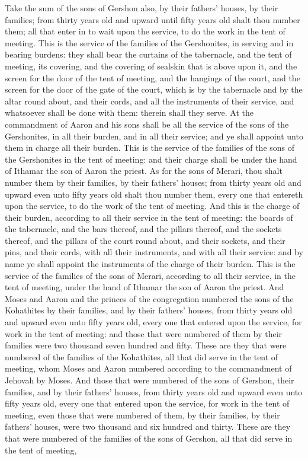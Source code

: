 Take the sum of the sons of Gershon also, by their fathers’ houses, by their families; from thirty years old and upward until fifty years old shalt thou number them; all that enter in to wait upon the service, to do the work in the tent of meeting. This is the service of the families of the Gershonites, in serving and in bearing burdens: they shall bear the curtains of the tabernacle, and the tent of meeting, its covering, and the covering of sealskin that is above upon it, and the screen for the door of the tent of meeting, and the hangings of the court, and the screen for the door of the gate of the court, which is by the tabernacle and by the altar round about, and their cords, and all the instruments of their service, and whatsoever shall be done with them: therein shall they serve. At the commandment of Aaron and his sons shall be all the service of the sons of the Gershonites, in all their burden, and in all their service; and ye shall appoint unto them in charge all their burden. This is the service of the families of the sons of the Gershonites in the tent of meeting: and their charge shall be under the hand of Ithamar the son of Aaron the priest.  As for the sons of Merari, thou shalt number them by their families, by their fathers’ houses; from thirty years old and upward even unto fifty years old shalt thou number them, every one that entereth upon the service, to do the work of the tent of meeting. And this is the charge of their burden, according to all their service in the tent of meeting: the boards of the tabernacle, and the bars thereof, and the pillars thereof, and the sockets thereof, and the pillars of the court round about, and their sockets, and their pins, and their cords, with all their instruments, and with all their service: and by name ye shall appoint the instruments of the charge of their burden. This is the service of the families of the sons of Merari, according to all their service, in the tent of meeting, under the hand of Ithamar the son of Aaron the priest.  And Moses and Aaron and the princes of the congregation numbered the sons of the Kohathites by their families, and by their fathers’ houses, from thirty years old and upward even unto fifty years old, every one that entered upon the service, for work in the tent of meeting: and those that were numbered of them by their families were two thousand seven hundred and fifty. These are they that were numbered of the families of the Kohathites, all that did serve in the tent of meeting, whom Moses and Aaron numbered according to the commandment of Jehovah by Moses.  And those that were numbered of the sons of Gershon, their families, and by their fathers’ houses, from thirty years old and upward even unto fifty years old, every one that entered upon the service, for work in the tent of meeting, even those that were numbered of them, by their families, by their fathers’ houses, were two thousand and six hundred and thirty. These are they that were numbered of the families of the sons of Gershon, all that did serve in the tent of meeting, 